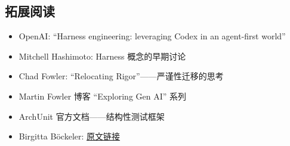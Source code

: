\documentclass[a4paper]{article}
\begin{document}
\subsection{拓展阅读}

\begin{itemize}[leftmargin=1.5em]
    \item OpenAI: ``Harness engineering: leveraging Codex in an agent-first world''
    \item Mitchell Hashimoto: Harness 概念的早期讨论
    \item Chad Fowler: ``Relocating Rigor''------严谨性迁移的思考
    \item Martin Fowler 博客 ``Exploring Gen AI'' 系列
    \item ArchUnit 官方文档------结构性测试框架
    \item Birgitta B\"{o}ckeler: \href{https://martinfowler.com/articles/exploring-gen-ai/harness-engineering.html}{原文链接}
\end{itemize}

\end{document}
